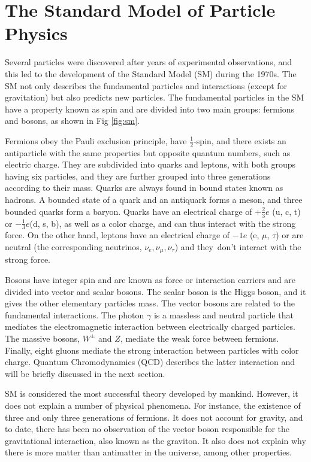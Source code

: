\chapter{\leavevmode\newline The Standard Model of Particle Physics}
\label{chap:chapter_1}
Several particles were discovered after years of experimental observations, and this led to the development of the Standard Model (SM) during the 1970s. The SM not only describes the fundamental particles and interactions (except for gravitation) but also predicts new particles. The fundamental particles in the SM have a property known as spin and are divided into two main groups: fermions and bosons, as shown in Fig \ref{fig:sm}.

Fermions obey the Pauli exclusion principle, have $\frac{1}{2}$-spin, and there exists an antiparticle with the same properties but opposite quantum numbers, such as electric charge. They are subdivided into quarks and leptons, with both groups having six particles, and they are further grouped into three generations according to their mass. Quarks are always found in bound states known as hadrons. A bounded state of a quark and an antiquark forms a meson, and three bounded quarks form a baryon. Quarks have an electrical charge of $+\frac{2}{3}e$ (u, c, t) or $-\frac{1}{3}e $(d, s, b), as well as a color charge, and can thus interact with the strong force. On the other hand, leptons have an electrical charge of $-1e$ (e, $\mu$, $\tau$) or are neutral (the corresponding neutrinos, $\nu_e, \nu_\mu, \nu_\tau$) and they don't interact with the strong force.

Bosons have integer spin and are known as force or interaction carriers and are divided into vector and scalar bosons. The scalar boson is the Higgs boson, and it gives the other elementary particles mass. The vector bosons are related to the fundamental interactions. The photon $\gamma$ is a massless and neutral particle that mediates the electromagnetic interaction between electrically charged particles. The massive bosons, $W^{\pm}$ and $Z$, mediate the weak force between fermions. Finally, eight gluons mediate the strong interaction between particles with color charge. Quantum Chromodynamics (QCD) describes the latter interaction and will be briefly discussed in the next section.

SM is considered the most successful theory developed by mankind. However, it does not explain a number of physical phenomena. For instance, the existence of three and only three generations of fermions. It does not account for gravity, and to date, there has been no observation of the vector boson responsible for the gravitational interaction, also known as the graviton. It also does not explain why there is more matter than antimatter in the universe, among other properties.

